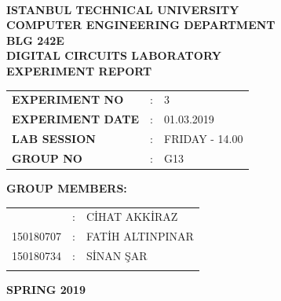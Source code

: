 \documentclass[pdftex,12pt,a4paper]{article}
\begin{document}
\begin{titlepage}
\begin{center}
\textbf{}\\
\textbf{\Large{ISTANBUL TECHNICAL UNIVERSITY}}\\
\vspace{0.5cm}
\textbf{\Large{COMPUTER ENGINEERING DEPARTMENT}}\\
\vspace{2cm}
\textbf{\Large{BLG 242E\\ DIGITAL CIRCUITS LABORATORY\\ EXPERIMENT REPORT}}\\
\vspace{2.8cm}
\begin{table}[ht]
\centering
\Large{
\begin{tabular}{lcl}
\textbf{EXPERIMENT NO}  & : & 3 \\
\textbf{EXPERIMENT DATE}  & : & 01.03.2019 \\
\textbf{LAB SESSION}  & : & FRIDAY - 14.00 \\
\textbf{GROUP NO}  & : & G13 \\
\end{tabular}}
\end{table}
\vspace{1cm}
\textbf{\Large{GROUP MEMBERS:}}\\
\begin{table}[ht]
\centering
\Large{
\begin{tabular}{rcl}
{
150180704  & : & C\.{I}HAT AKK\.{I}RAZ \\
150180707  & : & FAT\.{I}H ALTINPINAR \\
150180734  & : & S\.{I}NAN \c{S}AR \\
}
\end{tabular}}
\end{table}
\vspace{2.8cm}
\textbf{\Large{SPRING 2019}}

\end{center}

\end{titlepage}

\newpage
\newpage

\thispagestyle{empty}
\setcounter{tocdepth}{4}
\tableofcontents
\clearpage
\end{document}
